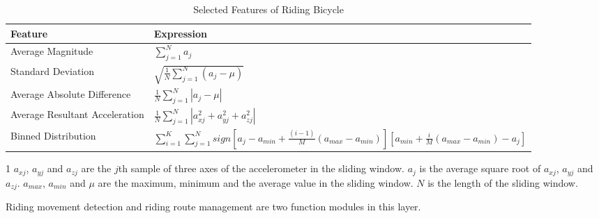 \documentclass{sigchi-ext}
\begin{document}
\begin{table}[h]
	\centering
	\caption{Selected Features of Riding Bicycle}
	\label{feature_table}
	\begin{threeparttable}
		\begin{tabular}{|l|l|}
			\hline
			\textbf{Feature}               & \textbf{Expression} \\ \hline
			Average Magnitude              &      $\sum_{j=1}^{N}a_{j}$              \\ \hline
			Standard Deviation             &      $\sqrt{\frac{1}{N}\sum_{j=1}^{N}(a_{j}-\mu )}$  \\ \hline
			Average Absolute Difference    &      $\frac{1}{N}\sum_{j=1}^{N}\left |a_{j}-\mu   \right |$\\ \hline
			Average Resultant Acceleration &      $\frac{1}{N}\sum_{j=1}^{N}\left |a_{xj}^2+a_{yj}^2+a_{zj}^2 \right |$   \\  \hline
			Binned Distribution            &      $\sum_{i=1}^{K}\sum_{j=1}^{N}sign\left [a_{j}-a_{min}+\frac{(i-1)}{M}(a_{max}-a_{min})\right ]\left [a_{min}+\frac{i}{M}(a_{max}-a_{min}) -a_j \right ]$              \\ \hline
		\end{tabular}
		\begin{tablenotes}
			\footnotesize
			\item[1] $a_{xj}$, $a_{yj}$ and $a_{zj}$ are the $j$th sample of three axes of the accelerometer in the sliding window. $a_{j}$ is the average square root of $a_{xj}$, $a_{yj}$ and $a_{zj}$. $a_{max}$, $a_{min}$ and $\mu$ are the maximum, minimum and the average value in the sliding window.  $N$ is the length of the sliding window. 
		\end{tablenotes}
	\end{threeparttable}
\end{table}


Riding movement detection and riding route management are two function modules in this layer. 
\end{document}

